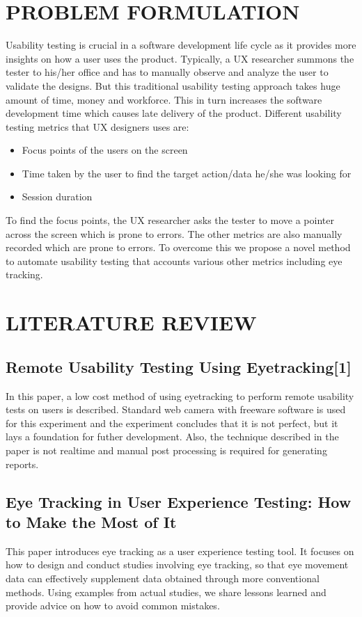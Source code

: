 \documentclass[12pt,a4paper,final]{extreport}
\begin{document}
\chapter{PROBLEM FORMULATION}
\vspace{0.3cm}
Usability testing is crucial in a software development life cycle as it provides more insights
on how a user uses the product. Typically, a UX researcher summons the tester to his/her office
and has to manually observe and analyze the user to validate the designs. But this traditional
usability testing approach takes huge amount of time, money and workforce. This in turn
increases the software development time which causes late delivery of the product. Different
usability testing metrics that UX designers uses are:
\begin{itemize}
    \item Focus points of the users on the screen
    \item Time taken by the user to find the target action/data he/she was looking for
    \item Session duration
\end{itemize}
To find the focus points, the UX researcher asks the tester to move a pointer across the
screen which is prone to errors. The other metrics are also manually recorded which are prone
to errors. To overcome this we propose a novel method to automate usability testing that accounts
various other metrics including eye tracking.


\newpage
\chapter{LITERATURE REVIEW}
\section{Remote Usability Testing Using Eyetracking[1]}
In this paper, a low cost method of using eyetracking to perform remote usability tests on users is described. Standard web camera with freeware software is used for this experiment and the experiment concludes that it is not perfect, but it lays a foundation for futher development. Also, the technique described in the paper is not realtime and manual post processing is required for generating reports.

\section{Eye Tracking in User Experience Testing:
How to Make the Most of It}
This paper introduces eye tracking as a user experience testing tool. It focuses on how to design and conduct studies involving eye tracking, so that eye movement data can effectively supplement data obtained through more conventional methods. Using examples from actual studies, we share lessons learned and provide advice on how to avoid common mistakes. 
\end{document}

